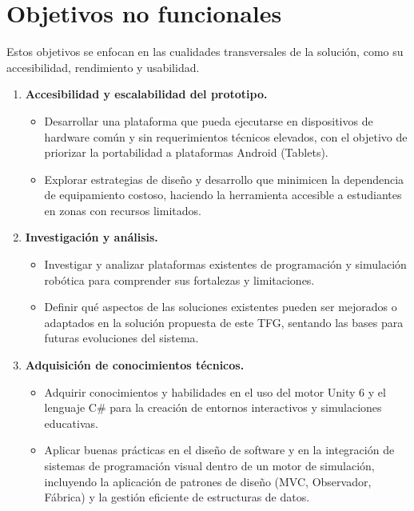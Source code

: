 \section{Objetivos no funcionales}

Estos objetivos se enfocan en las cualidades transversales de la solución, como su accesibilidad, rendimiento y usabilidad.

\begin{enumerate}
	\item \textbf{Accesibilidad y escalabilidad del prototipo.}
	\begin{itemize}
		\item Desarrollar una plataforma que pueda ejecutarse en dispositivos de hardware común y sin requerimientos técnicos elevados, con el objetivo de priorizar la portabilidad a plataformas Android (Tablets).
		\item Explorar estrategias de diseño y desarrollo que minimicen la dependencia de equipamiento costoso, haciendo la herramienta accesible a estudiantes en zonas con recursos limitados.

	\end{itemize}
	
	\item \textbf{Investigación y análisis.}
	\begin{itemize}
		\item Investigar y analizar plataformas existentes de programación y simulación robótica para comprender sus fortalezas y limitaciones.
		\item Definir qué aspectos de las soluciones existentes pueden ser mejorados o adaptados en la solución propuesta de este TFG, sentando las bases para futuras evoluciones del sistema.
	\end{itemize}
	
	\item \textbf{Adquisición de conocimientos técnicos.}
	\begin{itemize}
		\item Adquirir conocimientos y habilidades en el uso del motor Unity 6 y el lenguaje C\# para la creación de entornos interactivos y simulaciones educativas.
		\item Aplicar buenas prácticas en el diseño de software y en la integración de sistemas de programación visual dentro de un motor de simulación, incluyendo la aplicación de patrones de diseño (MVC, Observador, Fábrica) y la gestión eficiente de estructuras de datos.
	\end{itemize}
\end{enumerate}
